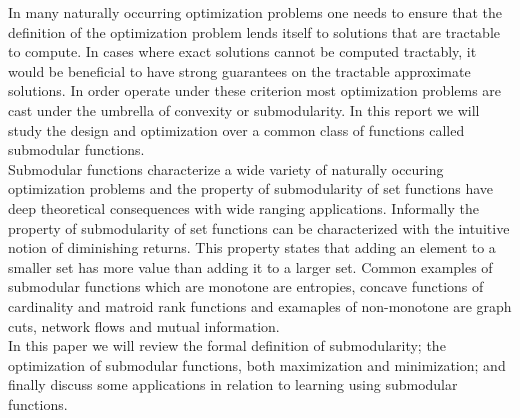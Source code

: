 In many naturally occurring optimization problems one needs to ensure that the definition of the optimization problem lends itself to solutions that are tractable to compute. In cases where exact solutions cannot be computed tractably, it would be beneficial to have strong guarantees on the tractable approximate solutions. In order operate under these criterion most optimization problems are cast under the umbrella of convexity or submodularity. In this report we will study the design and optimization over a common class of functions called submodular functions. \\

Submodular functions characterize a wide variety of naturally occuring optimization problems and the property of submodularity of set functions have deep theoretical consequences with wide ranging applications. Informally the property of submodularity of set functions can be characterized with the intuitive notion of diminishing returns. This property states that adding an element to a smaller set has more value than adding it to a larger set. Common examples of submodular functions which are monotone are entropies, concave functions of cardinality and matroid rank functions and examaples of non-monotone are graph cuts, network flows and mutual information. \\

In this paper we will review the formal definition of submodularity; the optimization of submodular functions, both maximization and minimization; and finally discuss some applications in relation to learning using submodular functions.
